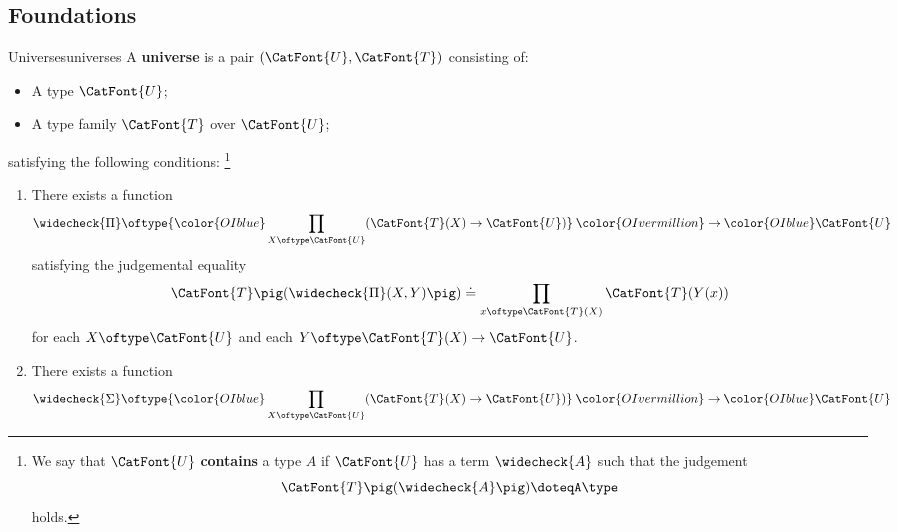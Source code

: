 \subsection{Foundations}\label{subsection-universes-foundations}
\begin{definition}{Universes}{universes}%
    A \textbf{universe} is a pair $(\CatFont{U},\CatFont{T})$ consisting of:
    \begin{itemize}
        \item{}A type $\CatFont{U}$;
        \item{}A type family $\CatFont{T}$ over $\CatFont{U}$;
    \end{itemize}
    satisfying the following conditions:%
    \footnote{%
        We say that $\CatFont{U}$ \textbf{contains} a type $A$ if $\CatFont{U}$ has a term $\widecheck{A}$ such that the judgement
        \[
            \CatFont{T}\pig(\widecheck{A}\pig)%
            \doteq%
            A%
            \type
        \]%
        holds.
        \par\vspace*{\TCBBoxCorrection}
    }%
    \begin{enumerate}
        \item\label{universes-closure-under-dependent-products}There exists a function
            \[
                \widecheck{\Pi}%
                \oftype%
                {\color{OIblue}\prod_{X\oftype\CatFont{U}}(\CatFont{T}(X)\to\CatFont{U})}%
                \mathbin{\color{OIvermillion}\to}%
                {\color{OIblue}\CatFont{U}}%
            \]%
            satisfying the judgemental equality
            \[
                \CatFont{T}\pig(\widecheck{\Pi}(X,Y)\pig)%
                \doteq%
                \prod_{x\oftype\CatFont{T}(X)}\CatFont{T}(Y(x))%
            \]%
            for each $X\oftype\CatFont{U}$ and each $Y\oftype\CatFont{T}(X)\to\CatFont{U}$.
        \item\label{universes-closure-under-dependent-pairs}There exists a function
            \[
                \widecheck{\Sigma}%
                \oftype%
                {\color{OIblue}\prod_{X\oftype\CatFont{U}}(\CatFont{T}(X)\to\CatFont{U})}%
                \mathbin{\color{OIvermillion}\to}%
                {\color{OIblue}\CatFont{U}}%
\]
\end{enumerate}
\end{definition}
